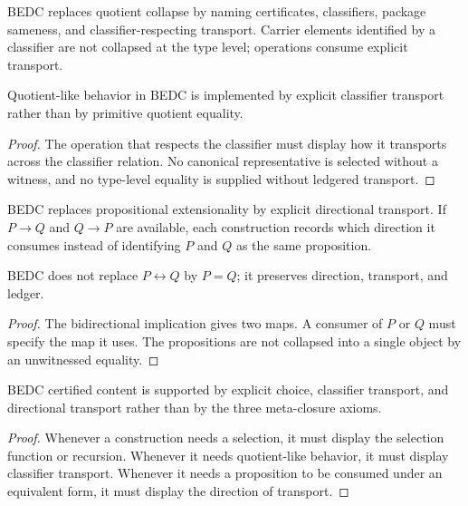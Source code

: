 \begin{definition}
\label{def:philosophy-classifier-transport-not-quotient-collapse}
BEDC replaces quotient collapse by naming certificates, classifiers,
package sameness, and classifier-respecting transport. Carrier
elements identified by a classifier are not collapsed at the type
level; operations consume explicit transport.
\end{definition}

\begin{theorem}
\label{thm:philosophy-classifier-transport-replaces-quotient-collapse}
Quotient-like behavior in BEDC is implemented by explicit classifier
transport rather than by primitive quotient equality.
\end{theorem}
\begin{proof}
The operation that respects the classifier must display how it
transports across the classifier relation. No canonical representative
is selected without a witness, and no type-level equality is supplied
without ledgered transport.
\end{proof}

\begin{definition}
\label{def:philosophy-directional-transport-not-prop-collapse}
BEDC replaces propositional extensionality by explicit directional
transport. If \(P\to Q\) and \(Q\to P\) are available, each
construction records which direction it consumes instead of identifying
\(P\) and \(Q\) as the same proposition.
\end{definition}

\begin{theorem}
\label{thm:philosophy-explicit-transport-replaces-prop-collapse}
BEDC does not replace \(P\leftrightarrow Q\) by \(P=Q\); it preserves
direction, transport, and ledger.
\end{theorem}
\begin{proof}
The bidirectional implication gives two maps. A consumer of \(P\) or
\(Q\) must specify the map it uses. The propositions are not collapsed
into a single object by an unwitnessed equality.
\end{proof}

\begin{theorem}
\label{thm:philosophy-certified-content-witness-preserving-replacements}
BEDC certified content is supported by explicit choice, classifier
transport, and directional transport rather than by the three
meta-closure axioms.
\end{theorem}
\begin{proof}
Whenever a construction needs a selection, it must display the
selection function or recursion. Whenever it needs quotient-like
behavior, it must display classifier transport. Whenever it needs a
proposition to be consumed under an equivalent form, it must display
the direction of transport.
\end{proof}

